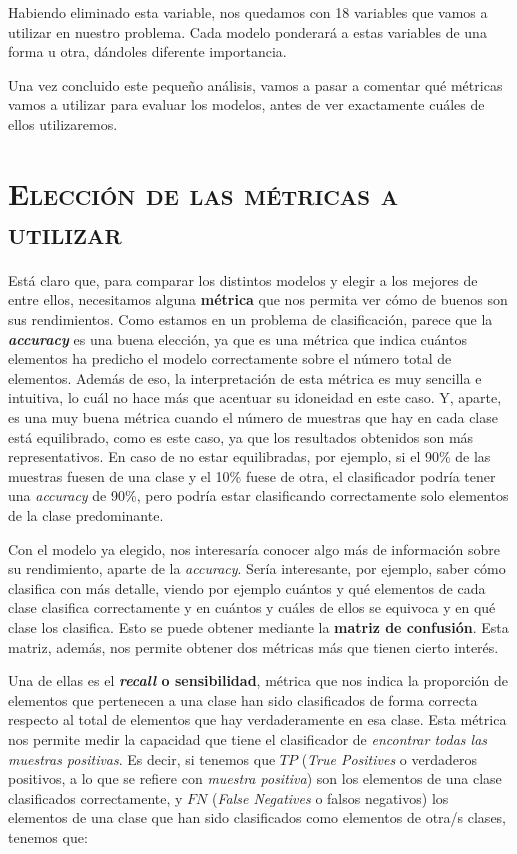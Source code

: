 \documentclass[11pt,a4paper]{article}
\begin{document}
Habiendo eliminado esta variable, nos quedamos con 18 variables que vamos a utilizar en nuestro problema. Cada modelo ponderará a estas
variables de una forma u otra, dándoles diferente importancia.

Una vez concluido este pequeño análisis, vamos a pasar a comentar qué métricas vamos a utilizar para evaluar los modelos, antes de ver
exactamente cuáles de ellos utilizaremos.

\newpage

\section{\textsc{Elección de las métricas a utilizar}}

Está claro que, para comparar los distintos modelos y elegir a los mejores de entre ellos, necesitamos alguna \textbf{métrica} que nos permita
ver cómo de buenos son sus rendimientos. Como estamos en un problema de clasificación, parece que la \textbf{\textit{accuracy}} es una buena
elección, ya que es una métrica que indica cuántos elementos ha predicho el modelo correctamente sobre el número total de elementos. Además
de eso, la interpretación de esta métrica es muy sencilla e intuitiva, lo cuál no hace más que acentuar su idoneidad en este caso. Y,
aparte, es una muy buena métrica cuando el número de muestras que hay en cada clase está equilibrado, como es este caso, ya que los
resultados obtenidos son más representativos. En caso de no estar equilibradas, por ejemplo, si el 90\% de las muestras fuesen de una clase
y el 10\% fuese de otra, el clasificador podría tener una \textit{accuracy} de 90\%, pero podría estar clasificando correctamente solo
elementos de la clase predominante.

Con el modelo ya elegido, nos interesaría conocer algo más de información sobre su rendimiento, aparte de la \textit{accuracy}. Sería
interesante, por ejemplo, saber cómo clasifica con más detalle, viendo por ejemplo cuántos y qué elementos de cada clase clasifica
correctamente y en cuántos y cuáles de ellos se equivoca y en qué clase los clasifica. Esto se puede obtener mediante la
\textbf{matriz de confusión}. Esta matriz, además, nos permite obtener dos métricas más que tienen cierto interés.

Una de ellas es el \textbf{\textit{recall} o sensibilidad}, métrica que nos indica la proporción de elementos que pertenecen a una clase han sido
clasificados de forma correcta respecto al total de elementos que hay verdaderamente en esa clase. Esta métrica nos permite medir la
capacidad que tiene el clasificador de \textit{encontrar todas las muestras positivas}\cite{bib:recall}. Es decir, si tenemos que $TP$
(\textit{True Positives} o verdaderos positivos, a lo que se refiere con \textit{muestra positiva}) son los elementos de una clase
clasificados correctamente, y $FN$ (\textit{False Negatives} o falsos negativos) los elementos de una clase que han sido clasificados como
elementos de otra/s clases, tenemos que:
\end{document}

